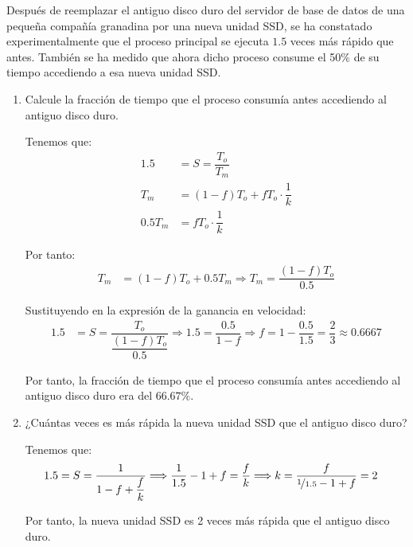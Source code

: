 \begin{ejercicio}
Después de reemplazar el antiguo disco duro del servidor de base de datos de una pequeña compañía granadina por una nueva unidad SSD, se ha constatado experimentalmente que el proceso principal se ejecuta $1.5$ veces más rápido que antes. También se ha medido que ahora dicho proceso consume el 50\% de su tiempo accediendo a esa nueva unidad SSD.
\begin{enumerate}
    \item Calcule la fracción de tiempo que el proceso consumía antes accediendo al antiguo disco duro.
    
    Tenemos que:
    \begin{align*}
        1.5 &= S = \dfrac{T_o}{T_m}\\
        T_m &= (1-f)T_o + fT_o\cdot \dfrac{1}{k}\\
        0.5T_m &= fT_o\cdot \dfrac{1}{k}
    \end{align*}

    Por tanto:
    \begin{align*}
        T_m &= (1-f)T_o + 0.5T_m \Longrightarrow
        T_m = \dfrac{(1-f)T_o}{0.5}
    \end{align*}

    Sustituyendo en la expresión de la ganancia en velocidad:
    \begin{align*}
        1.5 &= S = \dfrac{T_o}{\dfrac{(1-f)T_o}{0.5}}\Longrightarrow
        1.5 = \dfrac{0.5}{1-f}\Longrightarrow
        f=1-\dfrac{0.5}{1.5}=\dfrac{2}{3}\approx 0.6667
    \end{align*}

    Por tanto, la fracción de tiempo que el proceso consumía antes accediendo al antiguo disco duro era del $66.67\%$.
    \item ¿Cuántas veces es más rápida la nueva unidad SSD que el antiguo disco duro?
    
    Tenemos que:
    \begin{align*}
        1.5 &= S = \dfrac{1}{1-f+\dfrac{f}{k}}
        \Longrightarrow
        \dfrac{1}{1.5}-1+f = \dfrac{f}{k}\Longrightarrow
        k=\dfrac{f}{\nicefrac{1}{1.5}-1+f} = 2
    \end{align*}

    Por tanto, la nueva unidad SSD es 2 veces más rápida que el antiguo disco duro.
\end{enumerate}
\end{ejercicio}
\begin{comment}
SOLUCIÓN:
\begin{enumerate}
    \item 0,67 (67\%).
    \item 2 veces.
\end{enumerate}
\end{comment}